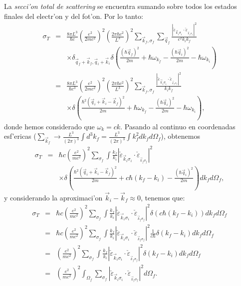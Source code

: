 La \textit{secci'on total de scattering} se encuentra sumando sobre todos
los estados finales del electr'on y del fot'on. Por lo tanto:%
\begin{eqnarray}
\sigma_{T} & = &\frac{8\pi L^3}{\hbar c}\left( \frac{e^2}{2mc^2%
}\right)^2\left( \frac{2\pi\hbar c^2}{L^3}\right)^2\sum_{\vec
{k}_f,\sigma_f}\sum_{\vec{q}_f}\frac{\left| \check{\varepsilon
}_{\vec{k}_i\sigma_i}\cdot\check{\varepsilon}_{_{\vec{k}_f\sigma_f}%
}\right|^2}{c^2k_ik_f} \nonumber\\
&& \times \delta_{\vec{q}_f+\vec{k}_f,\vec{q}%
_i+\vec{k}_i}\delta\left( \frac{\left( \hbar\vec{q}_f\right)^2%
}{2m}+\hbar\omega_{k_f}-\frac{\left( \hbar\vec{q}_i\right)^2}%
{2m}-\hbar\omega_{k_i}\right) \\
& = &\frac{8\pi L^3}{\hbar c^3}\left( \frac{e^2}{2mc^2}\right)
^2\left( \frac{2\pi\hbar c^2}{L^3}\right)^2\sum_{\vec{k}_f%
,\sigma_f}\frac{\left| \check{\varepsilon}_{\vec{k}_i\sigma_i}%
\cdot\check{\varepsilon}_{_{\vec{k}_f\sigma_f}}\right|^2}%
{k_ik_f} \nonumber\\
&&\times \delta\left( \frac{\hbar^2\left( \vec{q}_i+\vec{k}_i%
-\vec{k}_f\right)^2}{2m}+\hbar\omega_{k_f}-\frac{\left( \hbar\vec
{q}_i\right)^2}{2m}-\hbar\omega_{k_i}\right) ,
\end{eqnarray}
donde hemos considerado que $\omega_k=ck.$ Pasando al continuo en
coordenadas esf'ericas ($\sum_{\vec{k}_f}\rightarrow\frac{L^3}{\left(
2\pi\right) ^3}\int d^3k_f=\frac{L^3}{\left( 2\pi\right) ^3}\int
k_f^2dk_fd\Omega_f$), obtenemos
\begin{eqnarray}
\sigma_{T}&=&\hbar c\left( \frac{e^2}{mc^2}\right)
^2\sum_{\sigma_f}\int\frac{k_f}{k_i}\left|\check{\varepsilon}_{\vec{k}_{
i}\sigma_i}\cdot\check{\varepsilon}_{_{\vec{k}_f\sigma_f}}\right|^2
\nonumber\\
&&\times\delta\left( \frac{\hbar^2\left(
\vec{q}_i+\vec{k}_i-\vec{k}_f\right)^2}{2m}+c\hbar\left(
k_f-k_i\right) -\frac{\left(\hbar\vec{q}_i\right)^2}{2m}\right)
dk_fd\Omega_f,
\end{eqnarray}
y considerando la aproximaci'on $\vec{k}_i-\vec{k}_f\approx0$, tenemos que:%
\begin{eqnarray}
\sigma_{T} & = &\hbar c\left( \frac{e^2}{mc^2}\right)^2\sum
_{\sigma_f}\int\frac{k_f}{k_i}\left| \check{\varepsilon}_{\vec
{k}_i\sigma_i}\cdot\check{\varepsilon}_{_{\vec{k}_f\sigma_f}%
}\right|^2\delta\left( c\hbar\left( k_f-k_i\right) \right)
dk_fd\Omega_f\\
& = &\hbar c\left( \frac{e^2}{mc^2}\right)^2\sum_{\sigma_f}\int
\frac{k_f}{k_i}\left| \check{\varepsilon}_{\vec{k}_i\sigma_i}%
\cdot\check{\varepsilon}_{_{\vec{k}_f\sigma_f}}\right|^2\frac
{1}{c\hbar}\delta\left( k_f-k_i\right) dk_fd\Omega_f\\
& = &\left( \frac{e^2}{mc^2}\right)^2\sum_{\sigma_f}\int\frac{k_f%
}{k_i}\left| \check{\varepsilon}_{\vec{k}_i\sigma_i}\cdot
\check{\varepsilon}_{_{\vec{k}_f\sigma_f}}\right|^2\delta\left(
k_f-k_i\right) dk_fd\Omega_f\\
& = &\left( \frac{e^2}{mc^2}\right)^2\int_{\Omega_f}\sum_{\sigma
_f}\left| \check{\varepsilon}_{\vec{k}_i\sigma_i}\cdot
\check{\varepsilon}_{_{\vec{k}_f\sigma_f}}\right|^2d\Omega_f.
\end{eqnarray}
